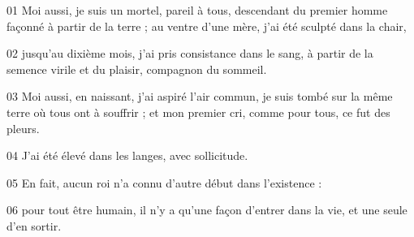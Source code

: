 01 Moi aussi, je suis un mortel, pareil à tous, descendant du premier homme façonné à partir de la terre ; au ventre d’une mère, j’ai été sculpté dans la chair,

02 jusqu’au dixième mois, j’ai pris consistance dans le sang, à partir de la semence virile et du plaisir, compagnon du sommeil.

03 Moi aussi, en naissant, j’ai aspiré l’air commun, je suis tombé sur la même terre où tous ont à souffrir ; et mon premier cri, comme pour tous, ce fut des pleurs.

04 J’ai été élevé dans les langes, avec sollicitude.

05 En fait, aucun roi n’a connu d’autre début dans l’existence :

06 pour tout être humain, il n’y a qu’une façon d’entrer dans la vie, et une seule d’en sortir.

